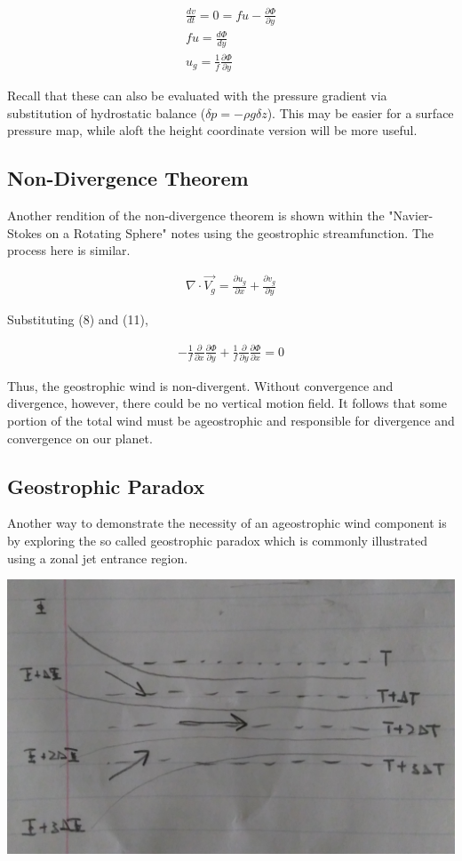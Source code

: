 \documentclass[a4paper,12pt]{article}
\begin{document}
\begin{align}
\frac{dv}{dt} = 0 = fu - \frac{\partial\Phi}{\partial y}\\
fu = \frac{d\Phi}{dy}\\
\boxed{u_g = \frac{1}{f}\frac{\partial \Phi}{\partial y}}
\end{align}

Recall that these can also be evaluated with the pressure gradient via substitution of hydrostatic balance ($\delta p = -\rho g\delta z$). This may be easier for a surface pressure map, while aloft the height coordinate version will be more useful. 

\subsection*{Non-Divergence Theorem}
Another rendition of the non-divergence theorem is shown within the "Navier-Stokes on a Rotating Sphere" notes using the geostrophic streamfunction. The process here is similar.

\begin{align}
\nabla \cdot \vec{V_g} = \frac{\partial u_g}{\partial x} + \frac{\partial v_g}{\partial y}
\end{align}

Substituting (8) and (11),

\begin{align}
-\frac{1}{f}\frac{\partial}{\partial x}\frac{\partial \Phi}{\partial y} + \frac{1}{f}\frac{\partial}{\partial y}\frac{\partial \Phi}{\partial x} = 0
\end{align}

Thus, the geostrophic wind is non-divergent. Without convergence and divergence, however, there could be no vertical motion field. It follows that some portion of the total wind must be ageostrophic and responsible for divergence and convergence on our planet.

\subsection*{Geostrophic Paradox}
Another way to demonstrate the necessity of an ageostrophic wind component is by exploring the so called geostrophic paradox which is commonly illustrated using a zonal jet entrance region.

\includegraphics[width = \textwidth]{geostrophic_approximation_1}
\end{document}
